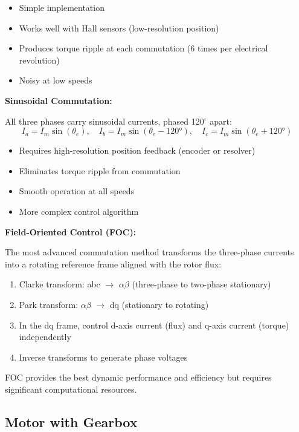 \begin{itemize}
    \item Simple implementation
    \item Works well with Hall sensors (low-resolution position)
    \item Produces torque ripple at each commutation (6 times per electrical revolution)
    \item Noisy at low speeds
\end{itemize}

\textbf{Sinusoidal Commutation:}

All three phases carry sinusoidal currents, phased 120$^\circ$ apart:
\begin{equation}
    I_a = I_m \sin(\theta_e), \quad I_b = I_m \sin(\theta_e - 120°), \quad I_c = I_m \sin(\theta_e + 120°)
\end{equation}

\begin{itemize}
    \item Requires high-resolution position feedback (encoder or resolver)
    \item Eliminates torque ripple from commutation
    \item Smooth operation at all speeds
    \item More complex control algorithm
\end{itemize}

\textbf{Field-Oriented Control (FOC):}

The most advanced commutation method transforms the three-phase currents into a rotating reference frame aligned with the rotor flux:

\begin{enumerate}
    \item Clarke transform: abc $\rightarrow$ $\alpha\beta$ (three-phase to two-phase stationary)
    \item Park transform: $\alpha\beta$ $\rightarrow$ dq (stationary to rotating)
    \item In the dq frame, control d-axis current (flux) and q-axis current (torque) independently
    \item Inverse transforms to generate phase voltages
\end{enumerate}

FOC provides the best dynamic performance and efficiency but requires significant computational resources.

\subsection{Motor with Gearbox}

